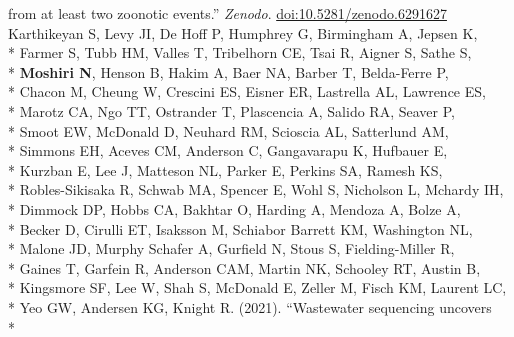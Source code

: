 \documentclass[margin,line]{res}
\begin{document}
\begin{resume}
\hspace*{8mm} from at least two zoonotic events.'' \textit{Zenodo}. \href{https://doi.org/10.5281/zenodo.6291627}{doi:10.5281/zenodo.6291627}\\
\hspace*{4mm} Karthikeyan S, Levy JI, De Hoff P, Humphrey G, Birmingham A, Jepsen K,\\*
\hspace*{9mm} Farmer S, Tubb HM, Valles T, Tribelhorn CE, Tsai R, Aigner S, Sathe S,\\*
\hspace*{9mm} \textbf{Moshiri N}, Henson B, Hakim A, Baer NA, Barber T, Belda-Ferre P,\\*
\hspace*{9mm} Chacon M, Cheung W, Crescini ES, Eisner ER, Lastrella AL, Lawrence ES,\\*
\hspace*{9mm} Marotz CA, Ngo TT, Ostrander T, Plascencia A, Salido RA, Seaver P,\\*
\hspace*{9mm} Smoot EW, McDonald D, Neuhard RM, Scioscia AL, Satterlund AM,\\*
\hspace*{9mm} Simmons EH, Aceves CM, Anderson C, Gangavarapu K, Hufbauer E,\\*
\hspace*{9mm} Kurzban E, Lee J, Matteson NL, Parker E, Perkins SA, Ramesh KS,\\*
\hspace*{9mm} Robles-Sikisaka R, Schwab MA, Spencer E, Wohl S, Nicholson L, Mchardy IH,\\*
\hspace*{9mm} Dimmock DP, Hobbs CA, Bakhtar O, Harding A, Mendoza A, Bolze A,\\*
\hspace*{9mm} Becker D, Cirulli ET, Isaksson M, Schiabor Barrett KM, Washington NL,\\*
\hspace*{9mm} Malone JD, Murphy Schafer A, Gurfield N, Stous S, Fielding-Miller R,\\*
\hspace*{9mm} Gaines T, Garfein R, Anderson CAM, Martin NK, Schooley RT, Austin B,\\*
\hspace*{9mm} Kingsmore SF, Lee W, Shah S, McDonald E, Zeller M, Fisch KM, Laurent LC,\\*
\hspace*{9mm} Yeo GW, Andersen KG, Knight R. (2021). ``Wastewater sequencing uncovers\\*

\end{resume}
\end{document}
